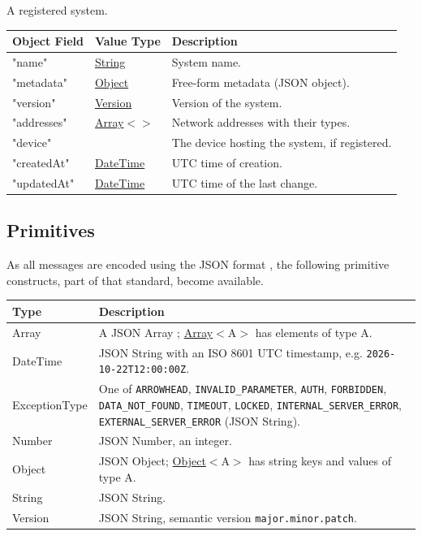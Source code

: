 \documentclass[a4paper]{arrowhead}
\newcommand{\mref}[2][]{{\textcolor{ArrowheadPurple}{\hyperref[sec:model:#2]{\ifstrempty{#1}{#2}{#1}}}}}
\newcommand{\pdef}[1]{{\textcolor{ArrowheadGrey}{#1 \label{sec:model:primitives:#1} \label{sec:model:primitives:#1s}}}}
\newcommand{\pref}[1]{{\textcolor{ArrowheadGrey}{\hyperref[sec:model:primitives:#1]{#1}}}}
\begin{document}

A registered system.


\noindent\begin{tabularx}{\textwidth}{| >{\raggedright\arraybackslash}p{3.9cm} | >{\raggedright\arraybackslash\small}p{5.3cm} | X |} \hline
\rowcolor{gray!33} Object Field & Value Type & Description \\ \hline
"name" & \pref{String} & System name. \\ \hline
"metadata" & \pref{Object} & Free-form metadata (JSON object). \\ \hline
"version" & \pref{Version} & Version of the system. \\ \hline
"addresses" & \pref{Array}$<$\allowbreak{}\mref{Address}$>$ & Network addresses with their types. \\ \hline
"device" & \mref{DeviceResponse} & The device hosting the system, if registered. \\ \hline
"created\allowbreak{}At" & \pref{DateTime} & UTC time of creation. \\ \hline
"updated\allowbreak{}At" & \pref{DateTime} & UTC time of the last change. \\ \hline
\end{tabularx}



\subsection{Primitives}
\label{sec:model:primitives}

As all messages are encoded using the JSON format \cite{rfc8259}, the following primitive constructs, part of that standard, become available.

\noindent\begin{tabularx}{\textwidth}{| p{4.6cm} | X |} \hline
\rowcolor{gray!33} Type & Description \\ \hline
\pdef{Array} & A JSON Array \cite{rfc8259}; \pref{Array}$<$A$>$ has elements of type A. \\ \hline
\pdef{DateTime} & JSON String with an ISO 8601 UTC timestamp, e.g. \texttt{2026-10-22T12:00:00Z}. \\ \hline
\pdef{ExceptionType} & One of \texttt{ARROWHEAD}, \texttt{INVALID\_\allowbreak{}PARAMETER}, \texttt{AUTH}, \texttt{FORBIDDEN}, \texttt{DATA\_\allowbreak{}NOT\_\allowbreak{}FOUND}, \texttt{TIMEOUT}, \texttt{LOCKED}, \texttt{INTERNAL\_\allowbreak{}SERVER\_\allowbreak{}ERROR}, \texttt{EXTERNAL\_\allowbreak{}SERVER\_\allowbreak{}ERROR} (JSON String). \\ \hline
\pdef{Number} & JSON Number, an integer. \\ \hline
\pdef{Object} & JSON Object; \pref{Object}$<$A$>$ has string keys and values of type A. \\ \hline
\pdef{String} & JSON String. \\ \hline
\pdef{Version} & JSON String, semantic version \texttt{major.minor.patch}. \\ \hline
\end{tabularx}
\end{document}
